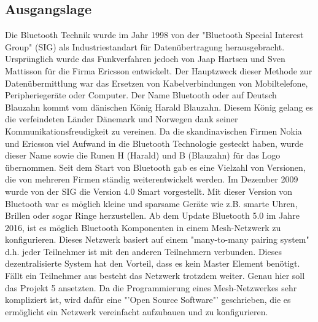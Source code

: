 
\subsection{Ausgangslage}\label{subsec:Ausgangslage}

Die Bluetooth Technik wurde im Jahr 1998 von der "Bluetooth Special Interest Group" (SIG) als Industriestandart für Datenübertragung herausgebracht. Ursprünglich wurde das Funkverfahren jedoch von Jaap Hartsen und Sven Mattisson für die Firma Ericsson entwickelt. Der Hauptzweck dieser Methode zur Datenübermittlung war das Ersetzen von Kabelverbindungen von Mobiltelefone, Peripheriegeräte oder Computer. Der Name Bluetooth oder auf Deutsch Blauzahn kommt vom dänischen König Harald Blauzahn. Diesem König gelang es die verfeindeten Länder Dänemark und Norwegen dank seiner Kommunikationsfreudigkeit zu vereinen. Da die skandinavischen Firmen Nokia und Ericsson viel Aufwand in die Bluetooth Technologie gesteckt haben, wurde dieser Name sowie die Runen H (Harald) und B (Blauzahn) für das Logo übernommen.\cite{michna_entwicklungsgeschichte_2019} Seit dem Start von Bluetooth gab es eine Vielzahl von Versionen, die von mehreren Firmen ständig weiterentwickelt werden. Im Dezember 2009 wurde von der SIG die Version 4.0 Smart vorgestellt. Mit dieser Version von Bluetooth war es möglich kleine und sparsame Geräte wie z.B. smarte Uhren, Brillen oder sogar Ringe herzustellen.\cite{bluetooth_sig_our_2019} Ab dem Update Bluetooth 5.0 im Jahre 2016, ist es möglich Bluetooth Komponenten in einem Mesh-Netzwerk zu konfigurieren. Dieses Netzwerk basiert auf einem "many-to-many pairing system" d.h. jeder Teilnehmer ist mit den anderen Teilnehmern verbunden. Dieses dezentralisierte System hat den Vorteil, dass es kein Master Element benötigt. Fällt ein Teilnehmer aus besteht das Netzwerk trotzdem weiter.\cite{woolley_intro_2017} Genau hier soll das Projekt 5 ansetzten. Da die Programmierung eines Mesh-Netzwerkes sehr kompliziert ist, wird dafür eine "'Open Source Software"' geschrieben, die es ermöglicht ein Netzwerk vereinfacht aufzubauen und zu konfigurieren.








